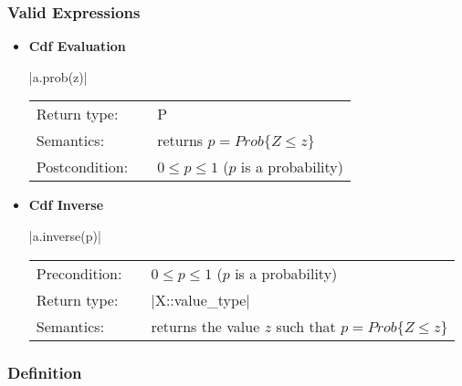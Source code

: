 \documentclass[12pt,twoside]{report}
\begin{document}
\htmlrule[CLEAR=all]  \subsubsection*{Valid Expressions}
\begin{itemize}
\item {\bf Cdf Evaluation}

  |a.prob(z)|

  \begin{tabular}[!h]{l p{1cm} p{10cm}}
    Return type: & & P\\
    Semantics: & & returns $p=Prob\{Z \le z\}$\\
    Postcondition: & & $0 \le p \le 1$ ($p$ is a probability)\\
  \end{tabular}

\item {\bf Cdf Inverse}

  |a.inverse(p)|

  \begin{tabular}[!h]{l p{1cm} p{10cm}}
    Precondition: & & $0 \le p \le 1$ ($p$ is a probability)\\
    Return type: & & |X::value_type|\\
    Semantics: & & returns the value $z$ such that $p=Prob\{Z \le z\}$\\
  \end{tabular}


%               
%               
\end{itemize}



\subsubsection{Definition}
\end{document}
